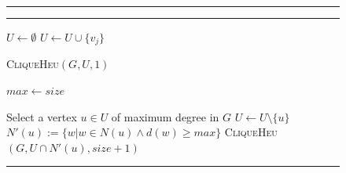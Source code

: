\begin{figure}
\vspace{10pt}
\hrule
\vspace{6pt}
\begin{spacing}{\algospacing}
{
{\small
{}\label{alg:mClqHeu}
\vspace{-5pt}
\hrule
\vspace{6pt}

\noindent\begin{minipage}{.5\textwidth}
\vspace{12pt}
\begin{algorithmic}[1]
{}
\State $U \leftarrow \emptyset$
\State $U \leftarrow U \cup \{v_j\}$ 
\EndIf
\EndFor

\State \textsc{CliqueHeu}$(G, U, 1)$
\EndIf

\EndFor
\EndProcedure
\end{algorithmic}
\end{minipage}%
\begin{minipage}{.5\textwidth}
\vspace{-7pt}
\label{alg:clqHeu}
\begin{algorithmic}[1]

\State $max \leftarrow size$
\EndIf
{}
\EndIf


\State Select a vertex $u \in U$ of maximum degree in $G$ \label{maxDsel}
\State $U \leftarrow U \setminus \{u\} $
\State $N'(u):= \{w | w \in N(u) \wedge d(w) \ge max\}$  \label{pr4}
\State \textsc{CliqueHeu}$( G, U \cap N'(u), size + 1)$


\EndProcedure

\end{algorithmic}
\end{minipage}
}
}
\end{spacing}
\vspace{8pt}
\hrule
\end{figure}



